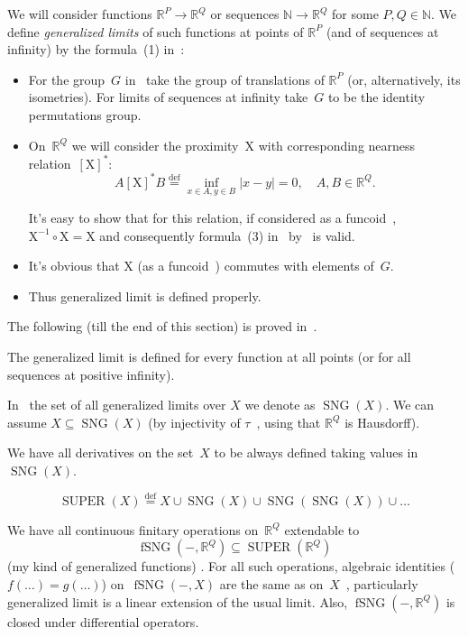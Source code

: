 \documentclass{amsart}
\DeclareMathOperator{\SUPER}{SUPER}
\DeclareMathOperator{\SNG}{SNG}
\DeclareMathOperator{\fSNG}{fSNG}
\newcommand{\eqdef}{\overset{\mathrm{def}}{=}}
\newcommand{\abs}[1]{\left\lvert #1\right\rvert}
\newcommand{\rsuprel}[1]{\left[#1\right]^\ast}
\begin{document}
We will consider functions $\mathbb{R}^P\to\mathbb{R}^Q$ or sequences $\mathbb{N}\to\mathbb{R}^Q$ for some $P,Q\in\mathbb{N}$. We define \emph{generalized limits} of such functions at points of $\mathbb{R}^P$ (and of sequences at infinity) by the formula~(1) in~\cite[p.~6]{limit}:
\begin{itemize}
\item For the group~$G$ in~\cite{limit} take the group of translations of $\mathbb{R}^P$ (or, alternatively, its isometries). For limits of sequences at infinity take~$G$ to be the identity permutations group.
\item On~$\mathbb{R}^Q$ we will consider the proximity~$\mathrm{X}$ with corresponding nearness relation~$\rsuprel{\mathrm{X}}$:
\[ A\rsuprel{\mathrm{X}}B \eqdef \inf_{x\in A,y\in B}\abs{x-y}=0,\quad A,B\in\mathbb{R}^Q. \]

It's easy to show that for this relation, if considered as a funcoid~\cite{volume-1-edition1}, $\mathrm{X}^{-1}\circ\mathrm{X}=\mathrm{X}$ and consequently formula~(3) in~\cite{limit} by~\cite[proposition~6, p.~6]{limit} is valid.
\item It's obvious that $\mathrm{X}$ (as a funcoid~\cite[chapter~7, p.~144]{volume-1-edition1}) commutes with elements of~$G$.
\item Thus generalized limit is defined properly.
\end{itemize}

The following (till the end of this section) is proved in~\cite{limit}.

The generalized limit is defined for every function at all points (or for all sequences at positive infinity).

In~\cite{limit} the set of all generalized limits over $X$ we denote as $\SNG(X)$. We can assume $X\subseteq\SNG(X)$ (by injectivity of $\tau$~\cite[p.~7]{limit}, using that $\mathbb{R}^Q$ is Hausdorff).

We have all derivatives on the set~$X$ to be always defined taking values in~$\SNG(X)$.

\[
\SUPER(X) \eqdef X\cup\SNG(X)\cup\SNG(\SNG(X))\cup\dots
\]

We have all continuous finitary operations on~$\mathbb{R}^Q$ extendable to
\[ \fSNG({-},\mathbb{R}^Q) \subseteq \SUPER(\mathbb{R}^Q) \]
(my kind of generalized functions) \cite[section 9, p.~8]{limit}. For all such operations, algebraic identities ($f(\dots)=g(\dots)$) on~$\fSNG({-},X)$ are the same as on~$X$~\cite[theorem 6, p.~10]{limit}, particularly generalized limit is a linear extension of the usual limit. Also, $\fSNG({-},\mathbb{R}^Q)$ is closed under differential operators.
\end{document}
